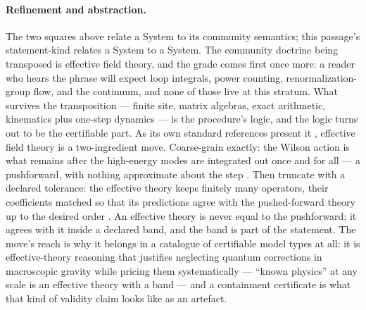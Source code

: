 \paragraph{Refinement and abstraction.} The two squares above relate
a System to its community semantics; this passage's statement-kind
relates a System to a System. The community doctrine being
transposed is effective field theory, and the grade comes first once
more: a reader who hears the phrase will expect loop integrals,
power counting, renormalization-group flow, and the continuum, and
none of those live at this stratum. What survives the transposition
--- finite site, matrix algebras, exact arithmetic, kinematics plus
one-step dynamics --- is the procedure's logic, and the logic turns
out to be the certifiable part. As its own standard references
present it \cite{burgess07,penco20}, effective field theory is a
two-ingredient move. Coarse-grain exactly: the Wilson action is what
remains after the high-energy modes are integrated out once and for
all --- a pushforward, with nothing approximate about the step
\cite{burgess07}. Then truncate with a declared tolerance: the
effective theory keeps finitely many operators, their coefficients
matched so that its predictions agree with the pushed-forward theory
up to the desired order \cite{penco20}. An effective theory is never
equal to the pushforward; it agrees with it inside a declared band,
and the band is part of the statement. The move's reach is why it
belongs in a catalogue of certifiable model types at all: it is
effective-theory reasoning that justifies neglecting quantum
corrections in macroscopic gravity while pricing them systematically
\cite{burgess07} --- ``known physics'' at any scale is an effective
theory with a band --- and a containment certificate is what that
kind of validity claim looks like as an artefact.


